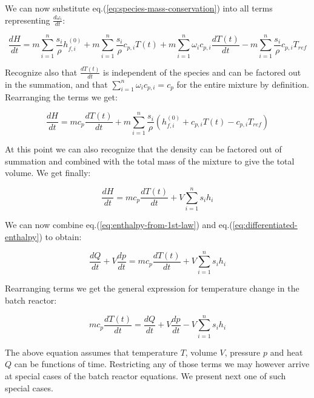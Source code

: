 We can now substitute eq.(\ref{eq:species-mass-conservation}) into all terms  representing $\frac{d \omega_i}{dt}$:

\begin{equation*}
\frac{dH}{dt} = m \sum_{i=1}^n  \frac{s_i}{\rho}  h_{f,i}^{(0)}  + m \sum_{i=1}^n \frac{s_i}{\rho} c_{p,i} T(t) + m \sum_{i=1}^n \omega_i c_{p,i} \frac{d T(t)}{dt}  - m \sum_{i=1}^n \frac{s_i}{\rho} c_{p,i} T_{ref}
\end{equation*}

Recognize also that $\frac{d T(t)}{dt}$ is independent of the species and can be factored out in the summation, and that $\sum_{i=1}^n \omega_i c_{p,i} = c_p$ for the entire mixture by definition. Rearranging the terms we get:

\begin{equation*}
\frac{dH}{dt} = m c_{p} \frac{d T(t)}{dt} + m \sum_{i=1}^n  \frac{s_i}{\rho}  ( h_{f,i}^{(0)} + c_{p,i} T(t)  - c_{p,i} T_{ref})
\end{equation*}

At this point we can also recognize that the density can be factored out of summation and combined with the total mass of the mixture to give the total volume. We get finally:

\begin{equation} \label{eq:differentiated-enthalpy}
\frac{dH}{dt} = m c_{p} \frac{d T(t)}{dt} + V \sum_{i=1}^n  s_i  h_i
\end{equation}

We can now combine eq.(\ref{eq:enthalpy-from-1st-law}) and eq.(\ref{eq:differentiated-enthalpy}) to obtain:

\begin{equation} 
\frac{dQ}{dt} + V \frac{dp}{dt} = m c_{p} \frac{d T(t)}{dt} + V \sum_{i=1}^n  s_i h_i
\end{equation}

Rearranging terms we get the general expression for temperature change in the batch reactor:

\begin{equation} \label{eq:bath-reactor-energy}
m c_{p} \frac{d T(t)}{dt}  = \frac{dQ}{dt} + V \frac{dp}{dt} - V \sum_{i=1}^n  s_i  h_i 
\end{equation}

The above equation assumes that temperature $T$, volume $V$, pressure $p$ and heat $Q$ can be functions of time. Restricting any of those terms we may however arrive at special cases of the batch reactor equations. We present next one of such special cases.

